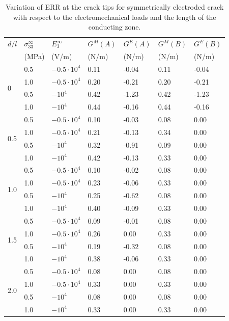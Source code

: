 \begin{table}[t]
	\centering
	\caption{Variation of ERR at the crack tips for symmetrically electroded crack with respect to the electromechanical loads and the length of the conducting zone.}
	\label{AdluckyTab1}
	\begin{tabular}{p{3em}p{4em}p{6em}p{5em}p{5em}p{5em}p{5em}}
		\toprule
		$d/l$ & $\sigma_{33}^{\infty}$ & $E_{3}^{\infty}$ & $G^M(A)$ & $G^E(A)$ & $G^M(B)$ & $G^E(B)$ \\
		& (MPa)                  & (V/m)            & (N/m)    & (N/m)    & (N/m)    & (N/m)    \\
		\midrule
		\multirow{4}{*}{0}
		& 0.5 & $-0.5 \cdot 10^4$ & 0.11 & -0.04 & 0.11 & -0.04 \\
		& 1.0 & $-0.5 \cdot 10^4$ & 0.20 & -0.21 & 0.20 & -0.21 \\
		& 0.5 & $-10^4$           & 0.42 & -1.23 & 0.42 & -1.23 \\
		& 1.0 & $-10^4$           & 0.44 & -0.16 & 0.44 & -0.16 \\
		\midrule
		\multirow{4}{*}{0.5}
		& 0.5 & $-0.5 \cdot 10^4$ & 0.10 & -0.03 & 0.08 &  0.00 \\
		& 1.0 & $-0.5 \cdot 10^4$ & 0.21 & -0.13 & 0.34 &  0.00 \\
		& 0.5 & $-10^4$           & 0.32 & -0.91 & 0.09 &  0.00 \\
		& 1.0 & $-10^4$           & 0.42 & -0.13 & 0.33 &  0.00 \\
		\midrule
		\multirow{4}{*}{1.0}
		& 0.5 & $-0.5 \cdot 10^4$ & 0.10 & -0.02 & 0.08 &  0.00 \\
		& 1.0 & $-0.5 \cdot 10^4$ & 0.23 & -0.06 & 0.33 &  0.00 \\
		& 0.5 & $-10^4$           & 0.25 & -0.62 & 0.08 &  0.00 \\
		& 1.0 & $-10^4$           & 0.40 & -0.09 & 0.33 &  0.00 \\
		\midrule
		\multirow{4}{*}{1.5}
		& 0.5 & $-0.5 \cdot 10^4$ & 0.09 & -0.01 & 0.08 &  0.00 \\
		& 1.0 & $-0.5 \cdot 10^4$ & 0.26 &  0.00 & 0.33 &  0.00 \\
		& 0.5 & $-10^4$           & 0.19 & -0.32 & 0.08 &  0.00 \\
		& 1.0 & $-10^4$           & 0.38 & -0.06 & 0.33 &  0.00 \\
		\midrule
		\multirow{4}{*}{2.0}
		& 0.5 & $-0.5 \cdot 10^4$ & 0.08 &  0.00 & 0.08 &  0.00 \\
		& 1.0 & $-0.5 \cdot 10^4$ & 0.33 &  0.00 & 0.33 &  0.00 \\
		& 0.5 & $-10^4$           & 0.08 &  0.00 & 0.08 &  0.00 \\
		& 1.0 & $-10^4$           & 0.33 &  0.00 & 0.33 &  0.00 \\
		\bottomrule
	\end{tabular}
\end{table}

